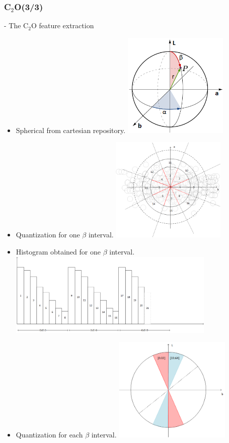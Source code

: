 \documentclass[xcolor=table]{beamer}
\begin{document}
\begin{frame}\frametitle{C$_2$O(3/3)}

- The C$_2$O feature extraction

\begin{itemize}
\item<1-> Spherical from cartesian repository.
 {\includegraphics[height=5cm]{Spherical_Coordinates.png}} %
\item<2-> Quantization for one $\beta$ interval.
 {\includegraphics[height=5cm]{QuantificationSphericToHist1.png}}
\item<3-> Histogram obtained for one $\beta$ interval.
 {\includegraphics[height=4cm]{QuantificationSphericToHist2.png}}
\item<4-> Quantization for each $\beta$ interval.
 {\includegraphics[height=5cm]{QuantificationSphericToHist3.png}}

\end{itemize}
\end{frame}
\end{document}
